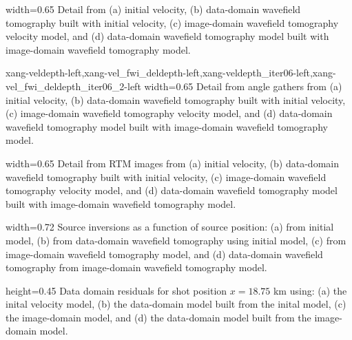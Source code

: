 {width=0.65\textwidth}{%
Detail from (a) initial velocity, (b) data-domain wavefield tomography built with initial velocity, %
(c) image-domain wavefield tomography velocity model, and (d) data-domain wavefield tomography model built with image-domain wavefield tomography model.}

{xang-veldepth-left,xang-vel_fwi_deldepth-left,xang-veldepth_iter06-left,xang-vel_fwi_deldepth_iter06_2-left}
{width=0.65\textwidth}{%
Detail from angle gathers from (a) initial velocity, (b) data-domain wavefield tomography built with initial velocity, %
(c) image-domain wavefield tomography velocity model, and (d) data-domain wavefield tomography model built with image-domain wavefield tomography model.}

{width=0.65\textwidth}{%
Detail from RTM images from (a) initial velocity, (b) data-domain wavefield tomography built with initial velocity, %
(c) image-domain wavefield tomography velocity model, and (d) data-domain wavefield tomography model built with image-domain wavefield tomography model.}

{width=0.72\textwidth}{ Source inversions as a function of source position: (a) from initial model, (b) from data-domain wavefield tomography using initial model,
 (c) from image-domain wavefield tomography model, and (d) data-domain wavefield tomography from image-domain wavefield tomography model.}


{height=0.45\textheight}{%
Data domain residuals for shot position $x=18.75$ km using: (a) the inital velocity model, (b) the data-domain model built
from the inital model, (c) the image-domain model, and (d) the data-domain model built from the image-domain model.}
